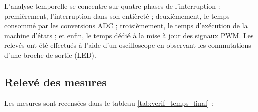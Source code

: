 L'analyse temporelle se concentre sur quatre phases de l'interruption : premièrement, l'interruption dans son entièreté ; deuxièmement, le temps consommé par les conversions ADC ; troisièmement, le temps d'exécution de la machine d'états ; et enfin, le temps dédié à la mise à jour des signaux PWM. Les relevés ont été effectués à l'aide d'un oscilloscope en observant les commutations d'une broche de sortie (LED).\\

\subsection{Relevé des mesures}
Les mesures sont recensées dans le tableau \ref{tab:verif_temps_final} :

\begin{table}[H]
    \centering
\end{table}
